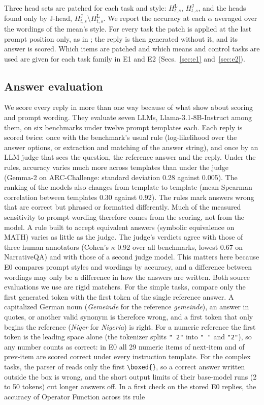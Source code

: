 \documentclass[11pt,a4paper]{article}
\begin{document}
Three head sets are patched for each task and style: $H^{\mathrm{L}}_{t,s}$, $H^{\mathrm{J}}_{t,s}$, and the heads found only by J-head, $H^{\mathrm{J}}_{t,s}\setminus H^{\mathrm{L}}_{t,s}$. We report the accuracy at each $\alpha$ averaged over the wordings of the mean's style.
For every task the patch is applied at the last prompt position only, as in \citet{yang2026shared}; the reply is then generated without it, and its answer is scored.
Which items are patched and which means and control tasks are used are given for each task family in E1 and E2 (Secs.~\ref{sec:e1} and~\ref{sec:e2}).

\subsection{Answer evaluation}\label{sec:evaluation}
We score every reply in more than one way because of what \citet{hua2025flaw} show about scoring and prompt wording. They evaluate seven LLMs, Llama-3.1-8B-Instruct among them, on six benchmarks under twelve prompt templates each. Each reply is scored twice: once with the benchmark's usual rule (log-likelihood over the answer options, or extraction and matching of the answer string), and once by an LLM judge that sees the question, the reference answer and the reply. Under the rules, accuracy varies much more across templates than under the judge (Gemma-2 on ARC-Challenge: standard deviation 0.28 against 0.005). The ranking of the models also changes from template to template (mean Spearman correlation between templates 0.30 against 0.92). The rules mark answers wrong that are correct but phrased or formatted differently. Much of the measured sensitivity to prompt wording therefore comes from the scoring, not from the model. A rule built to accept equivalent answers (symbolic equivalence on MATH) varies as little as the judge. The judge's verdicts agree with those of three human annotators (Cohen's $\kappa$ 0.92 over all benchmarks, lowest 0.67 on NarrativeQA) and with those of a second judge model. This matters here because E0 compares prompt styles and wordings by accuracy, and a difference between wordings may only be a difference in how the answers are written. Both source evaluations we use are rigid matchers. For the simple tasks, \citet{yang2026shared} compare only the first generated token with the first token of the single reference answer. A capitalized German noun (\emph{Gemeinde} for the reference \emph{gemeinde}), an answer in quotes, or another valid synonym is therefore wrong, and a first token that only begins the reference (\emph{Niger} for \emph{Nigeria}) is right. For a numeric reference the first token is the leading space alone (the tokenizer splits \texttt{" 2"} into \texttt{" "} and \texttt{"2"}), so any number counts as correct: in E0 all 29 numeric items of next-item and of prev-item are scored correct under every instruction template. For the complex tasks, the parser of \citet{fu2026rules} reads only the first \texttt{\textbackslash boxed\{\}}, so a correct answer written outside the box is wrong, and the short output limits of their base-model runs (2 to 50 tokens) cut longer answers off. In a first check on the stored E0 replies, the accuracy of Operator Function across its rule 
\end{document}
